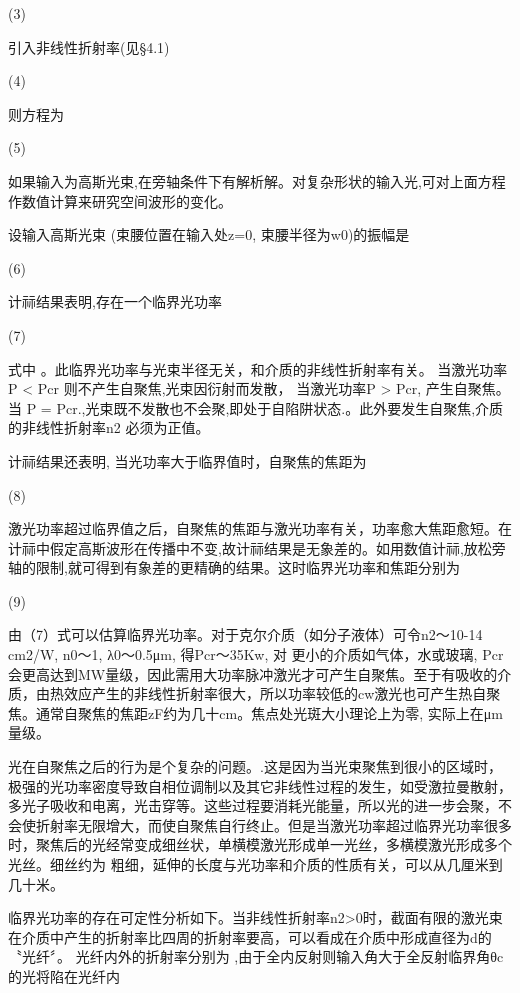                             (3)

引入非线性折射率(见§4.1)

                                               (4)

则方程为

                                 (5)

如果输入为高斯光束,在旁轴条件下有解析解。对复杂形状的输入光,可对上面方程作数值计算来研究空间波形的变化。 

设输入高斯光束 (束腰位置在输入处z=0, 束腰半径为w0)的振幅是

                               (6)

计祘结果表明,存在一个临界光功率

                                                           (7)

式中 。此临界光功率与光束半径无关，和介质的非线性折射率有关。 当激光功率P < Pcr 则不产生自聚焦,光束因衍射而发散， 当激光功率P > Pcr, 产生自聚焦。当 P = Pcr.,光束既不发散也不会聚,即处于自陷阱状态.。此外要发生自聚焦,介质的非线性折射率n2 必须为正值。

计祘结果还表明, 当光功率大于临界值时，自聚焦的焦距为

                                                        (8)

激光功率超过临界值之后，自聚焦的焦距与激光功率有关，功率愈大焦距愈短。在计祘中假定高斯波形在传播中不变,故计祘结果是无象差的。如用数值计祘,放松旁轴的限制,就可得到有象差的更精确的结果。这时临界光功率和焦距分别为

                                  (9)

由（7）式可以估算临界光功率。对于克尔介质（如分子液体）可令n2～10-14 cm2/W, n0～1, λ0～0.5μm, 得Pcr～35Kw, 对 更小的介质如气体，水或玻璃, Pcr 会更高达到MW量级，因此需用大功率脉冲激光才可产生自聚焦。至于有吸收的介质，由热效应产生的非线性折射率很大，所以功率较低的cw激光也可产生热自聚焦。通常自聚焦的焦距zF约为几十cm。焦点处光斑大小理论上为零, 实际上在μm量级。

光在自聚焦之后的行为是个复杂的问题。.这是因为当光束聚焦到很小的区域时，极强的光功率密度导致自相位调制以及其它非线性过程的发生，如受激拉曼散射，多光子吸收和电离，光击穿等。这些过程要消耗光能量，所以光的进一步会聚，不会使折射率无限增大，而使自聚焦自行终止。但是当激光功率超过临界光功率很多时，聚焦后的光经常变成细丝状，单横模激光形成单一光丝，多横模激光形成多个光丝。细丝约为 粗细，延伸的长度与光功率和介质的性质有关，可以从几厘米到几十米。

临界光功率的存在可定性分析如下。当非线性折射率n2>0时，截面有限的激光束在介质中产生的折射率比四周的折射率要高，可以看成在介质中形成直径为d的〝光纤〞。 光纤内外的折射率分别为 ,由于全内反射则输入角大于全反射临界角θc的光将陷在光纤内


